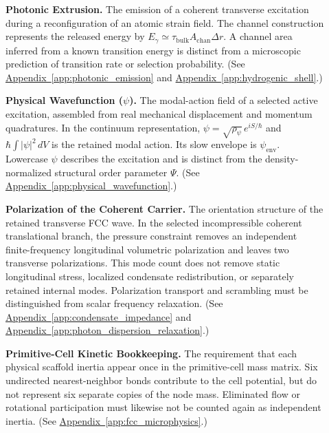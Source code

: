 \begin{description}
\item[] \begin{minipage}[t]{\linewidth}
\textbf{Photonic Extrusion.} The emission of a coherent transverse excitation during a reconfiguration of an atomic strain field. The channel construction represents the released energy by $E_\gamma\simeq\tau_{\mathrm{bulk}}A_{\mathrm{chan}}\Delta r$. A channel area inferred from a known transition energy is distinct from a microscopic prediction of transition rate or selection probability.
(See \hyperref[app:photonic_emission]{Appendix~\ref*{app:photonic_emission}} and \hyperref[app:hydrogenic_shell]{Appendix~\ref*{app:hydrogenic_shell}}.)
\end{minipage}

\item[] \begin{minipage}[t]{\linewidth}
\textbf{Physical Wavefunction ($\psi$).} The modal-action field of a selected active excitation, assembled from real mechanical displacement and momentum quadratures. In the continuum representation, $\psi=\sqrt{\rho_\psi}\,e^{iS/\hbar}$ and $\hbar\int|\psi|^2\,dV$ is the retained modal action. Its slow envelope is $\psi_{\mathrm{env}}$. Lowercase $\psi$ describes the excitation and is distinct from the density-normalized structural order parameter $\Psi$.
(See \hyperref[app:physical_wavefunction]{Appendix~\ref*{app:physical_wavefunction}}.)
\end{minipage}

\item[] \begin{minipage}[t]{\linewidth}
\textbf{Polarization of the Coherent Carrier.} The orientation structure of the retained transverse FCC wave. In the selected incompressible coherent translational branch, the pressure constraint removes an independent finite-frequency longitudinal volumetric polarization and leaves two transverse polarizations. This mode count does not remove static longitudinal stress, localized condensate redistribution, or separately retained internal modes. Polarization transport and scrambling must be distinguished from scalar frequency relaxation.
(See \hyperref[app:condensate_impedance]{Appendix~\ref*{app:condensate_impedance}} and \hyperref[app:photon_dispersion_relaxation]{Appendix~\ref*{app:photon_dispersion_relaxation}}.)
\end{minipage}

\item[] \begin{minipage}[t]{\linewidth}
\textbf{Primitive-Cell Kinetic Bookkeeping.} The requirement that each physical scaffold inertia appear once in the primitive-cell mass matrix. Six undirected nearest-neighbor bonds contribute to the cell potential, but do not represent six separate copies of the node mass. Eliminated flow or rotational participation must likewise not be counted again as independent inertia.
(See \hyperref[app:fcc_microphysics]{Appendix~\ref*{app:fcc_microphysics}}.)
\end{minipage}


\end{description}
